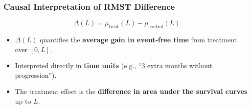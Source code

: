 \documentclass{beamer}
\begin{document}
\begin{frame}
\frametitle{Causal Interpretation of RMST Difference}

\begin{block}{}
\[
\Delta(L) = \mu_{\text{treat}}(L) - \mu_{\text{control}}(L)
\]

\begin{itemize}
  \item $\Delta(L)$ quantifies the \textbf{average gain in event-free time} from treatment over $[0,L]$.  
  \item Interpreted directly in \textbf{time units} (e.g., “3 extra months without progression”).  
  \item The treatment effect is the \textbf{difference in area under the survival curves} up to $L$.  
\end{itemize}
\end{block}


\end{frame}
\end{document}
